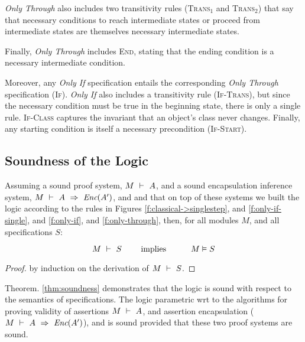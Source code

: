 \emph{Only Through} also includes two transitivity rules (\textsc{Trans}$_1$ and \textsc{Trans}$_2$)
that say that necessary conditions to reach intermediate states or 
proceed from intermediate states are themselves necessary intermediate states. 

Finally, \emph{Only Through} includes \textsc{End}, stating that the ending condition is 
a necessary intermediate condition.

Moreover, any \emph{Only If} specification entails the corresponding
 \emph{Only Through} specification (\textsc{If}).
\emph{Only If} also includes a transitivity rule (\textsc{If-Trans}), but 
since the necessary condition must be true in the beginning state,
there is only a single rule. \textsc{If-Class} captures the invariant that 
an object's class never changes.
Finally, any starting condition is
itself a necessary precondition (\textsc{If-Start}). 



\subsection{Soundness of the \Nec Logic}

\label{s:soundness}

\begin{theorem}[Soundness]
\label{thm:soundness}
Assuming a sound \SpecO proof system, $M\ \vdash\ A$, and
a sound encapsulation inference system, $M\ \vdash\ A\ \Rightarrow\ \textit{Enc}(A')$,
 and  and that on top of these systems we built
 the \Nec logic according to the rules in Figures \ref{f:classical->singlestep},  and \ref{f:only-if-single}, and \ref{f:only-if},  and \ref{f:only-through},   then, for    all modules $M$, and all \Nec specifications  $S$:
 
 $$\proves{M}{S}\ \ \ \ \ \ \ \mbox{implies}\ \ \ \ \ \  \ \ \ \satisfies{M}{S}$$
\end{theorem}

\begin{proof}
by induction on the derivation of $M\ \vdash\ S$.
\end{proof}

Theorem. \ref{thm:soundness} demonstrates 
 that the   \Nec logic is sound with respect to the semantics of \Nec specifications.
 The \Nec logic parametric wrt to the algorithms for proving validity of assertions
 $M\ \vdash\ A$, and 
 assertion encapsulation ($M\ \vdash\ A\ \Rightarrow\ \textit{Enc}(A')$), and is sound
 provided that these two proof systems are sound.


